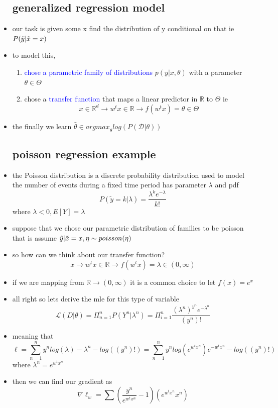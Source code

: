 \documentclass{article}
\begin{document}
\begin{itemize}
\subsection*{generalized regression model}
\item our task is given some x find the distribution of y conditional on that ie $P(\Tilde{y}|\tilde{x}=x)$
\item to model this,
\begin{enumerate}
    \item  \textcolor{blue}{chose a parametric family of distributions} $p(y|x,\theta)$ with a parameter $\theta\in\Theta $
    \item chose a  \textcolor{blue}{transfer function} that maps a linear predictor in $\mathbb{R}$ to $\Theta$ ie $$x\in \mathbb{R}^{d}\rightarrow w^{t}x\in \mathbb{R}\rightarrow f(w^{t}x)=\theta\in \Theta$$
\end{enumerate}
\item the finally we learn $\hat{\theta}\in {argmax}_{\theta}log(P(\mathcal{D}|\theta))$
\subsection*{poisson regression example}
\item the  Poisson distribution is a discrete probability distribution used to model the number of events during a fixed time period has parameter $\lambda$ and pdf $$P(\tilde{y}=k|\lambda)=\frac{\lambda ^{k}e^{-\lambda}}{k!}$$ where $\lambda <0, E[Y]=\lambda$
\item suppose that we chose our parametric distribution of families to be poisson that is assume $\Tilde{y}|\Tilde{x}=x,\eta\sim poisson(\eta)$
\item so how can we think about our transfer function? $$x\rightarrow w^{t}x\in \mathbb{R}\rightarrow f(w^{t}x)=\lambda\in(0,\infty)$$
\item if we are mapping from $\mathbb{R}\rightarrow (0,\infty)$ it is  a common choice to let $f(x)=e^{x}$
\item all right so lets derive the mle for this type of variable $$\mathcal{L}(D|\theta)=\Pi_{n=1}^{n}P(Y^{n}|\lambda^{n})=\Pi_{i=1}^{n}\frac{(\lambda^{n})^{y^n}e^{-\lambda^{n}}}{(y^n)!}$$
\item meaning that $$\ell=\sum_{n=1}^{n}y^nlog(\lambda)-\lambda^{n}-log((y^{n})!)=\sum_{n=1}^{n}y^nlog(e^{w^{t}x^{n}})e^{-w^{t}x^n}-log((y^{n})!)$$ where $\lambda^{n}=e^{w^{t}x^{n}}$
\item then we can find our gradient as $$\nabla \ell_{w}=\sum(\frac{y^{n}}{e^{w^t x^n}}-1)(e^{w^tx^n}x^n )$$

\end{itemize}
\end{document}
